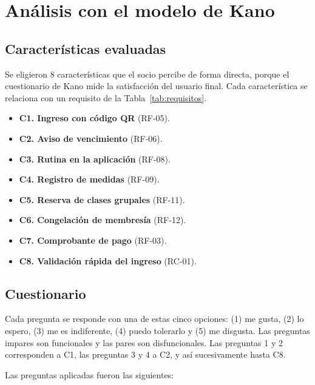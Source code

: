 \section{Análisis con el modelo de Kano}

\subsection{Características evaluadas}

Se eligieron 8 características que el socio percibe de forma directa, porque el cuestionario de Kano mide la satisfacción del usuario final. Cada característica se relaciona con un requisito de la Tabla~\ref{tab:requisitos}.

\begin{itemize}
\item \textbf{C1. Ingreso con código QR} (RF-05).
\item \textbf{C2. Aviso de vencimiento} (RF-06).
\item \textbf{C3. Rutina en la aplicación} (RF-08).
\item \textbf{C4. Registro de medidas} (RF-09).
\item \textbf{C5. Reserva de clases grupales} (RF-11).
\item \textbf{C6. Congelación de membresía} (RF-12).
\item \textbf{C7. Comprobante de pago} (RF-03).
\item \textbf{C8. Validación rápida del ingreso} (RC-01).
\end{itemize}

\subsection{Cuestionario}

Cada pregunta se responde con una de estas cinco opciones: (1) me gusta, (2) lo espero, (3) me es indiferente, (4) puedo tolerarlo y (5) me disgusta. Las preguntas impares son funcionales y las pares son disfuncionales. Las preguntas 1 y 2 corresponden a C1, las preguntas 3 y 4 a C2, y así sucesivamente hasta C8.

Las preguntas aplicadas fueron las siguientes:

